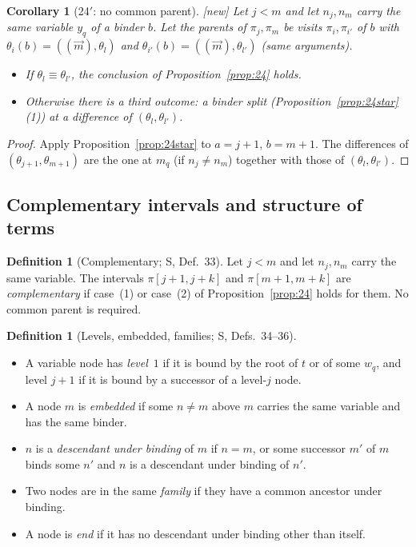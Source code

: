 \documentclass[11pt]{article}
\newcommand{\iv}[2]{\pi[#1,#2]}
\newcommand{\New}{\textsf{[new]}}
\theoremstyle{plain}
\newtheorem{corollary}[theorem]{Corollary}
\theoremstyle{definition}
\newtheorem{definition}[theorem]{Definition}
\theoremstyle{remark}
\begin{document}
\begin{corollary}[24$'$: no common parent]\label{cor:24prime}
\New{} Let $j<m$ and let $n_j,n_m$ carry the same variable $y_q$ of a
binder $b$.  Let the parents of $\pi_j,\pi_m$ be visits $\pi_i,\pi_{i'}$
of $b$ with $\theta_i(b)=((\vec m),\theta_l)$ and
$\theta_{i'}(b)=((\vec m),\theta_{l'})$ (same arguments).
\begin{itemize}
\item If $\theta_l\equiv\theta_{l'}$, the conclusion of
  Proposition~\ref{prop:24} holds.
\item Otherwise there is a third outcome: a binder split
  (Proposition~\ref{prop:24star}(1)) at a difference of
  $(\theta_l,\theta_{l'})$.
\end{itemize}
\end{corollary}
\begin{proof}
Apply Proposition~\ref{prop:24star} to $a=j+1$, $b=m+1$.  The
differences of $(\theta_{j+1},\theta_{m+1})$ are the one at $m_q$ (if
$n_j\ne n_m$) together with those of $(\theta_l,\theta_{l'})$.
\end{proof}

\subsection{Complementary intervals and structure of terms}

\begin{definition}[Complementary; S, Def.~33]\label{def:compl}
Let $j<m$ and let $n_j,n_m$ carry the same variable.  The intervals
$\iv{j+1}{j+k}$ and $\iv{m+1}{m+k}$ are \emph{complementary} if case~(1)
or case~(2) of Proposition~\ref{prop:24} holds for them.  No common
parent is required.
\end{definition}

\begin{definition}[Levels, embedded, families; S, Defs.~34--36]\label{def:struct}
\begin{itemize}
\item A variable node has \emph{level}~$1$ if it is bound by the root
  of $t$ or of some $w_q$, and level $j+1$ if it is bound by a successor
  of a level-$j$ node.
\item A node $m$ is \emph{embedded} if some $n\ne m$ above $m$ carries
  the same variable and has the same binder.
\item $n$ is a \emph{descendant under binding} of $m$ if $n=m$, or some
  successor $m'$ of $m$ binds some $n'$ and $n$ is a descendant under
  binding of $n'$.
\item Two nodes are in the same \emph{family} if they have a common
  ancestor under binding.
\item A node is \emph{end} if it has no descendant under binding other
  than itself.
\end{itemize}
\end{definition}
\end{document}
